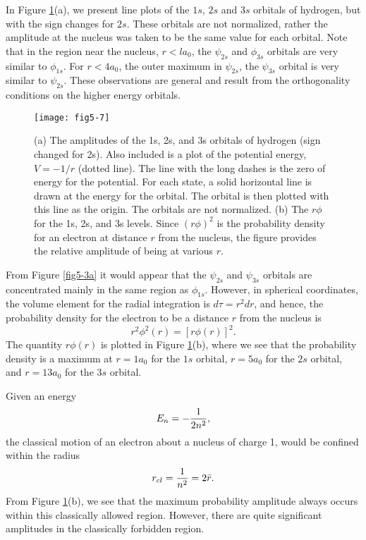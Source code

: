 In Figure \ref{fig5-7}(a), we present line plots of the $1s$, $2s$ and
$3s$ orbitals of hydrogen, but with the sign changes for $2s$.  These
orbitals are not normalized, rather the amplitude at the nucleus was
taken to be the same value for each orbital. Note that in the region
near the nucleus, $r < la_0$, the $\psi_{2s}$ and $\phi_{3s}$ orbitals
are very similar to $\phi_{1s}$.  For $r < 4a_0$, the outer maximum in
$\psi_{2s}$, the $\psi_{3s}$ orbital is very similar to $\psi_{2s}$.
These observations are general and result from the orthogonality
conditions on the higher energy orbitals.

\begin{figure}
\texttt{[image: fig5-7]}
\caption{(a) The amplitudes of the 1s, 2s, and 3s orbitals of
hydrogen (sign changed for 2s).  Also included is a plot of
the potential energy, $V = - 1/r$ (dotted line).  The line with the
long dashes is the zero of energy for the potential.  For each state,
a solid horizontal line is drawn at the energy for the orbital.  The
orbital is then plotted with this line as the origin.  The orbitals
are not normalized.  (b) The $r \phi$ for the 1s, 2s, and 3s
levels.  Since $(r \phi)^2$ is the probability density for an electron
at distance $r$ from the nucleus, the figure provides the relative
amplitude of being at various $r$.}
\label{fig5-7}
\end{figure}

From Figure \ref{fig5-3a} it would appear that the $\psi_{2s}$ and
$\psi_{3s}$ orbitals are concentrated mainly in the same region as
$\phi_{1s}$. However, in spherical coordinates, the volume element for
the radial integration is $d \tau = r^2 dr$, and hence, the
probability density for the electron to be a distance $r$ from the
nucleus is
\begin{equation}
r^2 \phi^2 ( r ) = [ r \phi ( r ) ]^2 .
\end{equation}
The quantity $r \phi (r)$ is plotted in Figure \ref{fig5-7}(b), where
we see that the probability density is a maximum at $r = 1a_0$ for the
$1s$ orbital, $r = 5a_0$ for the $2s$ orbital, and $r = 13a_0$ for the
$3s$ orbital.

Given an energy
\begin{equation}
E_n = - {1 \over 2n^2} ,
\end{equation}
the classical motion of an electron about a nucleus of charge 1, would be
confined within the radius
\begin{equation}
r_{cl} = {1 \over n^2} = 2 {\bar r} .
\end{equation}
From Figure \ref{fig5-7}(b), we see that the maximum probability
amplitude always occurs within this classically allowed region.
However, there are quite significant amplitudes in the classically
forbidden region.

